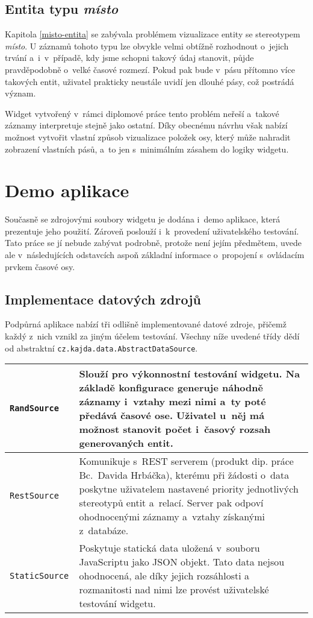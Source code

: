 			\subsection{Entita typu \emph{místo}}
				Kapitola \ref{misto-entita} se zabývala problémem vizualizace entity se stereotypem \emph{místo}. U záznamů tohoto typu lze obvykle velmi obtížně rozhodnout o~jejich trvání a~i~v~případě, kdy jsme schopni takový údaj stanovit, půjde pravděpodobně o~velké časové rozmezí. Pokud pak bude v~pásu přítomno více takových entit, uživatel prakticky neustále uvidí jen dlouhé pásy, což postrádá význam.
				
				Widget vytvořený v~rámci diplomové práce tento problém neřeší a~takové záznamy interpretuje stejně jako ostatní. Díky obecnému návrhu však nabízí možnost vytvořit vlastní způsob vizualizace položek osy, který může nahradit zobrazení vlast\-ních pásů, a~to jen s~minimálním zásahem do logiky widgetu.
			
		\section{Demo aplikace}				
			Současně se zdrojovými soubory widgetu je dodána i~demo aplikace, která prezentuje jeho použití. Zároveň poslouží i~k~provedení uživatelského testování. Tato práce se jí nebude zabývat podrobně, protože není jejím předmětem, uvede ale v~následujících odstavcích aspoň základní informace o~propojení s~ovládacím prvkem časové osy.
			
			\subsection{Implementace datových zdrojů}
			Podpůrná aplikace nabízí tři odlišně implementované datové zdroje, přičemž každý z~nich vznikl za jiným účelem testování. Všechny níže uvedené třídy dědí od abstraktní {\tt cz.kajda.data.AbstractDataSource}.
			
			\begin{longtable}{|p{}p{}|}
					\hline
					{\tt RandSource} & Slouží pro výkonnostní testování widgetu. Na základě konfigurace generuje náhodně záznamy i~vztahy mezi nimi a~ty poté předává časové ose. Uživatel u~něj má možnost stanovit počet i~časový rozsah generovaných entit.\\
					\hline
					\tt RestSource & Komunikuje s~REST serverem (produkt dip. práce Bc.~Davida Hrbáčka), kterému při žádosti o~data poskytne uživatelem nastavené priority jednotlivých stereotypů entit a~relací. Server pak odpoví ohodnocenými záznamy a~vztahy získanými z~databáze.\\
					\hline
					\tt StaticSource & Poskytuje statická data uložená v~souboru JavaScriptu jako JSON objekt. Tato data nejsou ohodnocená, ale díky jejich rozsáhlosti a rozmanitosti nad nimi lze provést uživatelské testování widgetu.\\
					\hline
				\end{longtable}
				
